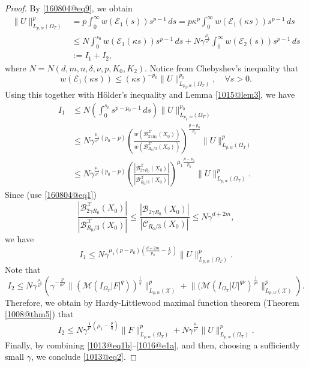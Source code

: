 \documentclass[reqno]{amsart}
\numberwithin{equation}{section}
\theoremstyle{plain}
\theoremstyle{definition}
\theoremstyle{remark}
\begin{document}
\begin{proof}
By \eqref{160804@eq9}, we obtain
\begin{align}
\nonumber
\|U\|_{L_{p,w}(\Omega_T)}^p&=p\int_0^\infty w({\mathcal{E}}_1(s))s^{p-1}\,ds =p\kappa^p\int_0^\infty w({\mathcal{E}}_1(\kappa s))s^{p-1}\,ds\\
\nonumber
&\le N\int_0^{s_0} w({\mathcal{E}}_1(\kappa s))s^{p-1}\,ds+N\gamma^{\frac{\mu_1}{\nu'}}\int_{0}^\infty w({\mathcal{E}}_2( s))s^{p-1}\,ds\\
\label{1013@eq1b}
&:=I_1+I_2,
\end{align}
where $N=N(d,m,n,\delta,\nu,p,K_0, K_2)$.
Notice from Chebyshev's inequality that
$$
w({\mathcal{E}}_1(\kappa s))\le (\kappa s)^{-p_0}\|U\|_{L_{p_0,w}(\Omega_T)}^{p_0}, \quad \forall s>0.
$$
Using this together with H\"older's inequality and Lemma \ref{1015@lem3},  we have 
\begin{align*}
I_1&\le N \left(\int_0^{s_0}s^{p-p_0-1}\,ds\right)\|U\|^{p_0}_{L_{p_0,w}(\Omega_T)}\\
&\le N\gamma^{\frac{\mu_1}{\nu'}(p_0-p)}\left(\frac{w({\mathcal{B}}^{\mathcal{X}}_{2\gamma R_0}(X_0))}{w({\mathcal{B}}^{\mathcal{X}}_{R_0/3}(X_0))}\right)^{\frac{p-p_0}{p_0}}\|U\|_{L_{p,w}(\Omega_T)}^p\\
&\le N\gamma^{\frac{\mu_1}{\nu'}(p_0-p)}\left(\frac{|{\mathcal{B}}^{\mathcal{X}}_{2\gamma R_0}(X_0)|}{|{\mathcal{B}}^{\mathcal{X}}_{R_0/3}(X_0)|}\right)^{\mu_1\frac{p-p_0}{p_0}}\|U\|_{L_{p,w}(\Omega_T)}^p.
\end{align*}
Since (use \eqref{160804@eq1})
$$
\frac{|{\mathcal{B}}^{\mathcal{X}}_{2\gamma R_0}(X_0)|}{|{\mathcal{B}}^{\mathcal{X}}_{R_0/3}(X_0)|}\le \frac{|{\mathcal{B}}_{2\gamma R_0}(X_0)|}{|{\mathcal{C}}_{R_0/3}(X_0)|}\le N\gamma^{d+2m},
$$
we have
$$
I_1\le N\gamma^{\mu_1(p-p_0)\left(\frac{d+2m}{p_0}-\frac{1}{\nu'}\right)}\|U\|^p_{L_{p,w}(\Omega_T)}.
$$
Note that
\[
I_2\le N\gamma^{\frac{\mu_1}{\nu'}}\left(\gamma^{-\frac{p}{q\nu'}}\big\|({\mathcal{M}}(I_{\Omega_T}|F|^q))^{\frac{1}{q}}\big\|^p_{L_{p,w}({\mathcal{X}})}+\big\|({\mathcal{M}}(I_{\Omega_T}|U|^{q\nu})^{\frac{1}{q\nu}}\big\|^p_{L_{p,w}({\mathcal{X}})}\right).
\]
Therefore, we obtain by Hardy-Littlewood maximal function theorem (Theorem \ref{1008@thm5}) that 
\begin{equation}		\label{1016@e1a}
I_2\le N\gamma^{\frac{1}{\nu'}\left(\mu_1-\frac{p}{q}\right)}\|F\|_{L_{p,w}(\Omega_T)}^p+N\gamma^{\frac{\mu_1}{\nu'}}\|U\|_{L_{p,w}(\Omega_T)}^p.
\end{equation}
Finally, by combining \eqref{1013@eq1b}--\eqref{1016@e1a},  and then, choosing a sufficiently small $\gamma$, we conclude \eqref{1013@eq2}.
\end{proof}
\end{document}
